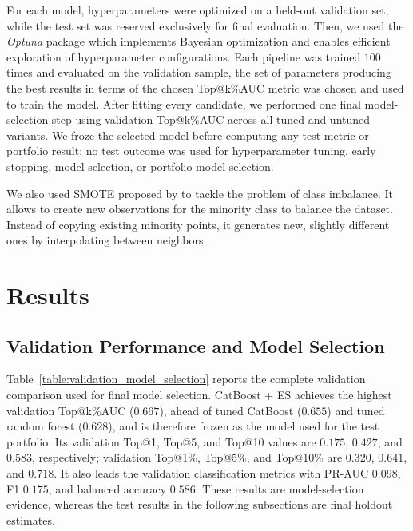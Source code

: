 \documentclass{ieeeaccess}
\begin{document}
For each model, hyperparameters were optimized on a held-out validation set, while the test set was reserved exclusively for final evaluation. Then, we used the \textit{Optuna} package \cite{optuna_2019} which implements Bayesian optimization and enables efficient exploration of hyperparameter configurations. Each pipeline was trained $100$ times and evaluated on the validation sample, the set of parameters producing the best results in terms of the chosen Top@k\%AUC metric was chosen and used to train the model. After fitting every candidate, we performed one final model-selection step using validation Top@k\%AUC across all tuned and untuned variants. We froze the selected model before computing any test metric or portfolio result; no test outcome was used for hyperparameter tuning, early stopping, model selection, or portfolio-model selection.

We also used SMOTE proposed by \cite{chawla2002smote} to tackle the problem of class imbalance. It allows to create new observations for the minority class to balance the dataset. Instead of copying existing minority points, it generates new, slightly different ones by interpolating between neighbors.


\section{Results}
\label{section:results}

\subsection{Validation Performance and Model Selection}

Table~\ref{table:validation_model_selection} reports the complete validation comparison used for final model selection. CatBoost + ES achieves the highest validation Top@k\%AUC ($0.667$), ahead of tuned CatBoost ($0.655$) and tuned random forest ($0.628$), and is therefore frozen as the model used for the test portfolio. Its validation Top@1, Top@5, and Top@10 values are $0.175$, $0.427$, and $0.583$, respectively; validation Top@1\%, Top@5\%, and Top@10\% are $0.320$, $0.641$, and $0.718$. It also leads the validation classification metrics with PR-AUC $0.098$, F1 $0.175$, and balanced accuracy $0.586$. These results are model-selection evidence, whereas the test results in the following subsections are final holdout estimates.
\end{document}
